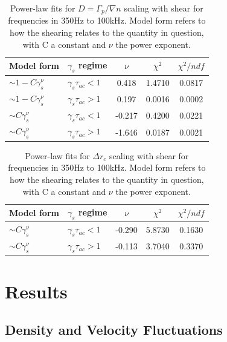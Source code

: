 \documentclass[aip,pop,amsmath,amssymb,reprint,superscriptaddress]{revtex4-1} %
\begin{document}
\begin{table}
\caption{\label{tab:table4}Power-law fits for $D = \Gamma_{p}/\nabla{n}$ scaling with shear for frequencies in 350Hz to 100kHz. Model form refers to how the shearing relates to the quantity in question, with C a constant and $\nu$ the power exponent.}
\begin{ruledtabular}
\begin{tabular}{llccc}
Model form&$\gamma_{s}$ regime&$\nu$&$\chi^2$&$\chi^2/ndf$\\
\hline
$\sim 1-C\gamma_{s}^\nu$&$\gamma_{s}\tau_{ac}<1$ &0.418   &1.4710    &0.0817\\
$\sim 1-C\gamma_{s}^\nu$&$\gamma_{s}\tau_{ac}>1$ &0.197   &0.0016    &0.0002\\
$\sim C\gamma_{s}^\nu$&$\gamma_{s}\tau_{ac}<1$   &-0.217  &0.4200    &0.0221\\
$\sim C\gamma_{s}^\nu$&$\gamma_{s}\tau_{ac}>1$   &-1.646  &0.0187    &0.0021\\
\end{tabular}
\end{ruledtabular}
\end{table}

\begin{table}
\caption{\label{tab:table6}Power-law fits for $\Delta r_{c}$ scaling with shear for frequencies in 350Hz to 100kHz. Model form refers to how the shearing relates to the quantity in question, with C a constant and $\nu$ the power exponent.}
\begin{ruledtabular}
\begin{tabular}{llccc}
Model form&$\gamma_{s}$ regime&$\nu$&$\chi^2$&$\chi^2/ndf$\\
\hline
$\sim C\gamma_{s}^\nu$&$\gamma_{s}\tau_{ac}<1$ &-0.290 &5.8730 &0.1630\\
$\sim C\gamma_{s}^\nu$&$\gamma_{s}\tau_{ac}>1$ &-0.113 &3.7040 &0.3370\\
\end{tabular}
\end{ruledtabular}
\end{table}

\section{Results}

\subsection{Density and Velocity Fluctuations}
\end{document}
